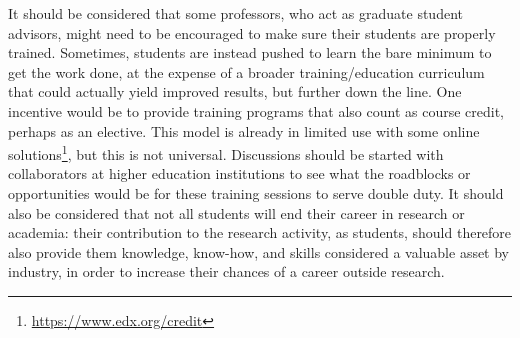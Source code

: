 \documentclass[12pt,a4paper]{article}
\begin{document}
It should be considered that some professors, who act as graduate student
advisors, might need to be encouraged to make sure their students are properly
trained. Sometimes, students are instead pushed to learn the bare minimum to get
the work done, at the expense of a broader training/education curriculum that
could actually yield improved results, but further down the line. One incentive
would be to provide training programs that also count as course credit, perhaps
as an elective. This model is already in limited use with some online
solutions\footnote{\url{https://www.edx.org/credit}}, but this is not universal.
Discussions should be started with collaborators at higher education
institutions to see what the roadblocks or opportunities would be for these
training sessions to serve double duty.
It should also be considered that not all students will end their career in
research or academia: their contribution to the research activity, as students,
should therefore also provide them knowledge, know-how, and skills considered a
valuable asset by industry, in order to increase their chances of a career
outside research.
\end{document}
